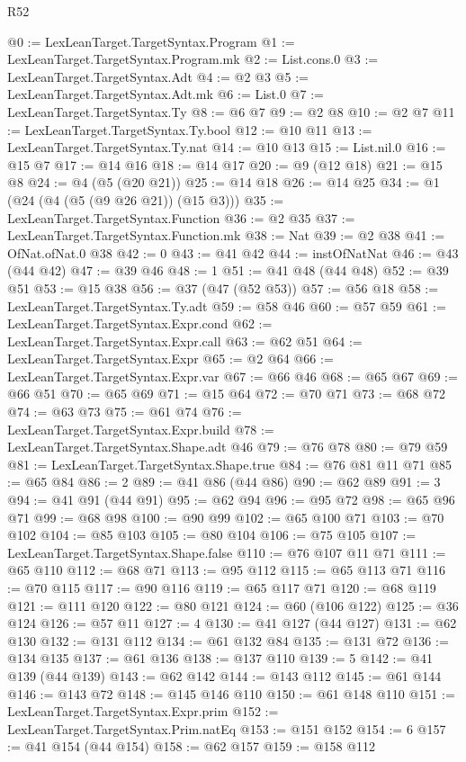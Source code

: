 \begin{lexlean}{R52}
\begin{coremodule}
@0 := LexLeanTarget.TargetSyntax.Program
@1 := LexLeanTarget.TargetSyntax.Program.mk
@2 := List.cons.{0}
@3 := LexLeanTarget.TargetSyntax.Adt
@4 := @2 @3
@5 := LexLeanTarget.TargetSyntax.Adt.mk
@6 := List.{0}
@7 := LexLeanTarget.TargetSyntax.Ty
@8 := @6 @7
@9 := @2 @8
@10 := @2 @7
@11 := LexLeanTarget.TargetSyntax.Ty.bool
@12 := @10 @11
@13 := LexLeanTarget.TargetSyntax.Ty.nat
@14 := @10 @13
@15 := List.nil.{0}
@16 := @15 @7
@17 := @14 @16
@18 := @14 @17
@20 := @9 (@12 @18)
@21 := @15 @8
@24 := @4 (@5 (@20 @21))
@25 := @14 @18
@26 := @14 @25
@34 := @1 (@24 (@4 (@5 (@9 @26 @21)) (@15 @3)))
@35 := LexLeanTarget.TargetSyntax.Function
@36 := @2 @35
@37 := LexLeanTarget.TargetSyntax.Function.mk
@38 := Nat
@39 := @2 @38
@41 := OfNat.ofNat.{0} @38
@42 := 0
@43 := @41 @42
@44 := instOfNatNat
@46 := @43 (@44 @42)
@47 := @39 @46
@48 := 1
@51 := @41 @48 (@44 @48)
@52 := @39 @51
@53 := @15 @38
@56 := @37 (@47 (@52 @53))
@57 := @56 @18
@58 := LexLeanTarget.TargetSyntax.Ty.adt
@59 := @58 @46
@60 := @57 @59
@61 := LexLeanTarget.TargetSyntax.Expr.cond
@62 := LexLeanTarget.TargetSyntax.Expr.call
@63 := @62 @51
@64 := LexLeanTarget.TargetSyntax.Expr
@65 := @2 @64
@66 := LexLeanTarget.TargetSyntax.Expr.var
@67 := @66 @46
@68 := @65 @67
@69 := @66 @51
@70 := @65 @69
@71 := @15 @64
@72 := @70 @71
@73 := @68 @72
@74 := @63 @73
@75 := @61 @74
@76 := LexLeanTarget.TargetSyntax.Expr.build
@78 := LexLeanTarget.TargetSyntax.Shape.adt @46
@79 := @76 @78
@80 := @79 @59
@81 := LexLeanTarget.TargetSyntax.Shape.true
@84 := @76 @81 @11 @71
@85 := @65 @84
@86 := 2
@89 := @41 @86 (@44 @86)
@90 := @62 @89
@91 := 3
@94 := @41 @91 (@44 @91)
@95 := @62 @94
@96 := @95 @72
@98 := @65 @96 @71
@99 := @68 @98
@100 := @90 @99
@102 := @65 @100 @71
@103 := @70 @102
@104 := @85 @103
@105 := @80 @104
@106 := @75 @105
@107 := LexLeanTarget.TargetSyntax.Shape.false
@110 := @76 @107 @11 @71
@111 := @65 @110
@112 := @68 @71
@113 := @95 @112
@115 := @65 @113 @71
@116 := @70 @115
@117 := @90 @116
@119 := @65 @117 @71
@120 := @68 @119
@121 := @111 @120
@122 := @80 @121
@124 := @60 (@106 @122)
@125 := @36 @124
@126 := @57 @11
@127 := 4
@130 := @41 @127 (@44 @127)
@131 := @62 @130
@132 := @131 @112
@134 := @61 @132 @84
@135 := @131 @72
@136 := @134 @135
@137 := @61 @136
@138 := @137 @110
@139 := 5
@142 := @41 @139 (@44 @139)
@143 := @62 @142
@144 := @143 @112
@145 := @61 @144
@146 := @143 @72
@148 := @145 @146 @110
@150 := @61 @148 @110
@151 := LexLeanTarget.TargetSyntax.Expr.prim
@152 := LexLeanTarget.TargetSyntax.Prim.natEq
@153 := @151 @152
@154 := 6
@157 := @41 @154 (@44 @154)
@158 := @62 @157
@159 := @158 @112

\end{coremodule}
\end{lexlean}
